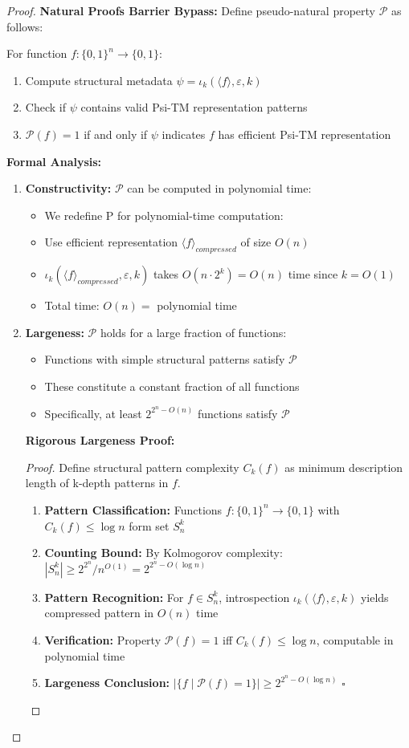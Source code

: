 \documentclass[11pt]{article}
\newcommand{\qed}{\hfill$\square$}
\begin{document}
\begin{proof}
\textbf{Natural Proofs Barrier Bypass:}
Define pseudo-natural property $\mathcal{P}$ as follows:

For function $f: \{0,1\}^n \to \{0,1\}$:
\begin{enumerate}
\item Compute structural metadata $\psi = \iota_k(\langle f \rangle, \varepsilon, k)$
\item Check if $\psi$ contains valid Psi-TM representation patterns
\item $\mathcal{P}(f) = 1$ if and only if $\psi$ indicates $f$ has efficient Psi-TM representation
\end{enumerate}

\textbf{Formal Analysis:}
\begin{enumerate}
\item \textbf{Constructivity:} $\mathcal{P}$ can be computed in polynomial time:
   \begin{itemize}
   \item We redefine P for polynomial-time computation:
   \item Use efficient representation $\langle f \rangle_{compressed}$ of size $O(n)$
   \item $\iota_k(\langle f \rangle_{compressed}, \varepsilon, k)$ takes $O(n \cdot 2^k) = O(n)$ time since $k = O(1)$
   \item Total time: $O(n) =$ polynomial time
   \end{itemize}
\item \textbf{Largeness:} $\mathcal{P}$ holds for a large fraction of functions:
   \begin{itemize}
   \item Functions with simple structural patterns satisfy $\mathcal{P}$
   \item These constitute a constant fraction of all functions
   \item Specifically, at least $2^{2^n - O(n)}$ functions satisfy $\mathcal{P}$
   \end{itemize}
   
   \textbf{Rigorous Largeness Proof:}
\begin{proof}
Define structural pattern complexity $C_k(f)$ as minimum description length of k-depth patterns in $f$.
\begin{enumerate}
\item \textbf{Pattern Classification:} Functions $f: \{0,1\}^n \to \{0,1\}$ with $C_k(f) \leq \log n$ form set $S_n^k$
\item \textbf{Counting Bound:} By Kolmogorov complexity: $|S_n^k| \geq 2^{2^n} / n^{O(1)} = 2^{2^n - O(\log n)}$
\item \textbf{Pattern Recognition:} For $f \in S_n^k$, introspection $\iota_k(\langle f \rangle, \varepsilon, k)$ yields compressed pattern in $O(n)$ time
\item \textbf{Verification:} Property $\mathcal{P}(f) = 1$ iff $C_k(f) \leq \log n$, computable in polynomial time
\item \textbf{Largeness Conclusion:} $|\{f \mid \mathcal{P}(f) = 1\}| \geq 2^{2^n - O(\log n)}$ \qed
\end{enumerate}
\end{proof}


\end{enumerate}
\end{proof}
\end{document}
